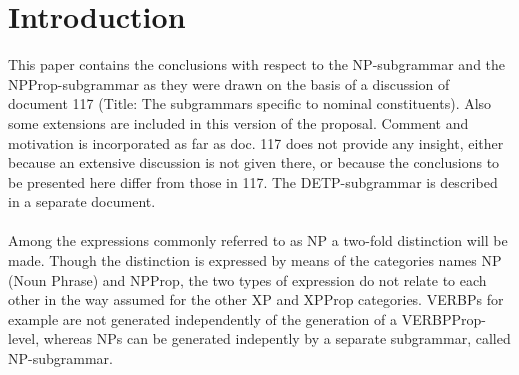 

   \RosDate{\today}
   \MakeRosTitle
%
%   
%   
%
%
\section{Introduction}
This paper contains the conclusions with respect to the NP-subgrammar
and the NPProp-subgrammar 
as they were drawn on the basis of a discussion of document 117
(Title: 
The subgrammars specific to 
nominal constituents). Also some extensions are included in this version of the
proposal. Comment and motivation is incorporated as far as doc. 117 does not
provide any insight, either because an extensive discussion is not given there,
or because the conclusions to be presented here differ from those in 117.
The DETP-subgrammar is described in a separate document.\\ \\ 
Among the expressions commonly referred to as NP a two-fold distinction will
be made. Though the distinction is expressed by means of the categories names
NP (Noun Phrase) and NPProp, the two types of expression do not 
relate to each other in the way assumed for the other XP and XPProp categories.
VERBPs for example are not generated independently of the 
generation of
a VERBPProp-level, whereas NPs can be generated indepently by 
a separate subgrammar, called NP-subgrammar.

